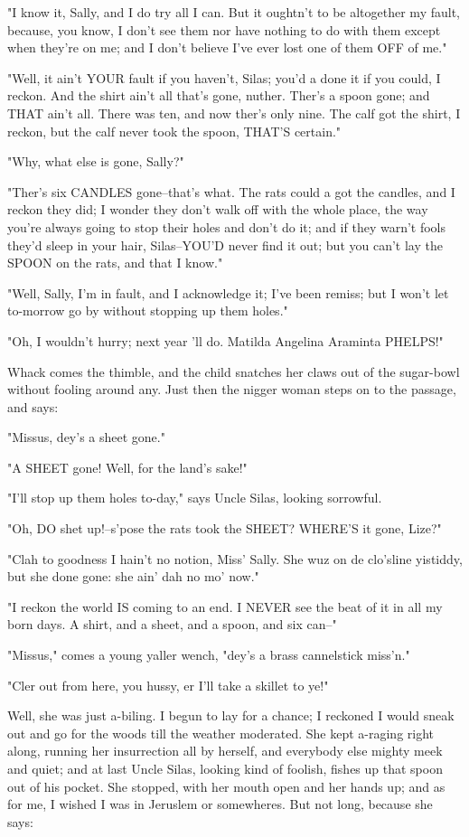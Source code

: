 "I know it, Sally, and I do try all I can.  But it oughtn't to be
altogether my fault, because, you know, I don't see them nor have nothing
to do with them except when they're on me; and I don't believe I've ever
lost one of them OFF of me."

"Well, it ain't YOUR fault if you haven't, Silas; you'd a done it if you
could, I reckon.  And the shirt ain't all that's gone, nuther.  Ther's a
spoon gone; and THAT ain't all.  There was ten, and now ther's only nine.
The calf got the shirt, I reckon, but the calf never took the spoon,
THAT'S certain."

"Why, what else is gone, Sally?"

"Ther's six CANDLES gone--that's what.  The rats could a got the candles,
and I reckon they did; I wonder they don't walk off with the whole place,
the way you're always going to stop their holes and don't do it; and if
they warn't fools they'd sleep in your hair, Silas--YOU'D never find it
out; but you can't lay the SPOON on the rats, and that I know."

"Well, Sally, I'm in fault, and I acknowledge it; I've been remiss; but I
won't let to-morrow go by without stopping up them holes."

"Oh, I wouldn't hurry; next year 'll do.  Matilda Angelina Araminta
PHELPS!"

Whack comes the thimble, and the child snatches her claws out of the
sugar-bowl without fooling around any.  Just then the nigger woman steps
on to the passage, and says:

"Missus, dey's a sheet gone."

"A SHEET gone!  Well, for the land's sake!"

"I'll stop up them holes to-day," says Uncle Silas, looking sorrowful.

"Oh, DO shet up!--s'pose the rats took the SHEET?  WHERE'S it gone,
Lize?"

"Clah to goodness I hain't no notion, Miss' Sally.  She wuz on de
clo'sline yistiddy, but she done gone:  she ain' dah no mo' now."

"I reckon the world IS coming to an end.  I NEVER see the beat of it in
all my born days.  A shirt, and a sheet, and a spoon, and six can--"

"Missus," comes a young yaller wench, "dey's a brass cannelstick miss'n."

"Cler out from here, you hussy, er I'll take a skillet to ye!"

Well, she was just a-biling.  I begun to lay for a chance; I reckoned I
would sneak out and go for the woods till the weather moderated.  She
kept a-raging right along, running her insurrection all by herself, and
everybody else mighty meek and quiet; and at last Uncle Silas, looking
kind of foolish, fishes up that spoon out of his pocket.  She stopped,
with her mouth open and her hands up; and as for me, I wished I was in
Jeruslem or somewheres. But not long, because she says:

